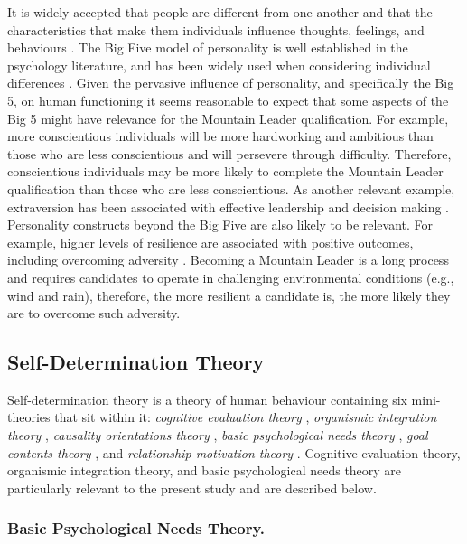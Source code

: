 \documentclass[
  12pt,
  a4paper,
]{book}
\begin{document}
It is widely accepted that people are different from one another and that the characteristics that make them individuals influence thoughts, feelings, and behaviours \citep[cf.~][]{Roberts2015}. The Big Five model of personality \citep{McCrae1987} is well established in the psychology literature, and has been widely used when considering individual differences \citep{Allen2013}. Given the pervasive influence of personality, and specifically the Big 5, on human functioning it seems reasonable to expect that some aspects of the Big 5 might have relevance for the Mountain Leader qualification. For example, more conscientious individuals will be more hardworking and ambitious than those who are less conscientious \citep{McRae1987} and will persevere through difficulty. Therefore, conscientious individuals may be more likely to complete the Mountain Leader qualification than those who are less conscientious. As another relevant example, extraversion has been associated with effective leadership \citep{Judge2002} and decision making \citep{Hardy1996}. Personality constructs beyond the Big Five are also likely to be relevant. For example, higher levels of resilience are associated with positive outcomes, including overcoming adversity \citep{Smith2008}. Becoming a Mountain Leader is a long process and requires candidates to operate in challenging environmental conditions (e.g., wind and rain), therefore, the more resilient a candidate is, the more likely they are to overcome such adversity.

\hypertarget{gen-intro-sdt}{%
\subsection{Self-Determination Theory}\label{gen-intro-sdt}}

Self-determination theory \citep{Deci1985b, Deci2000, Ryan2017} is a theory of human behaviour containing six mini-theories that sit within it: \emph{cognitive evaluation theory} \citep{Deci1975, Deci1980}, \emph{organismic integration theory} \citep{Deci1985b, Ryan1989}, \emph{causality orientations theory} \citep{Deci1985a}, \emph{basic psychological needs theory} \citep{Ryan2000a}, \emph{goal contents theory} \citep{Kasser1996, Niemiec2009}, and \emph{relationship motivation theory} \citep{Deci2014, Ryan2017}. Cognitive evaluation theory, organismic integration theory, and basic psychological needs theory are particularly relevant to the present study and are described below.

\hypertarget{basic-psychological-needs-theory.}{%
\subsubsection{Basic Psychological Needs Theory.}\label{basic-psychological-needs-theory.}}
\end{document}
